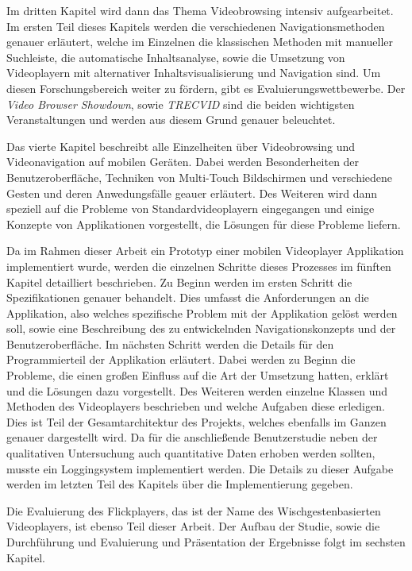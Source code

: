 \documentclass[11pt,a4paper]{report}
\begin{document}
Im dritten Kapitel wird dann das Thema Videobrowsing intensiv aufgearbeitet. Im ersten Teil dieses Kapitels werden die verschiedenen Navigationsmethoden genauer erläutert, welche im Einzelnen die klassischen Methoden mit manueller Suchleiste, die automatische Inhaltsanalyse, sowie die Umsetzung von Videoplayern mit alternativer Inhaltsvisualisierung und Navigation sind. Um diesen Forschungsbereich weiter zu fördern, gibt es Evaluierungswettbewerbe. Der \emph{Video Browser Showdown}, sowie \emph{TRECVID} sind die beiden wichtigsten Veranstaltungen und werden aus diesem Grund genauer beleuchtet. 

Das vierte Kapitel beschreibt alle Einzelheiten über Videobrowsing und Videonavigation auf mobilen Geräten. Dabei werden Besonderheiten der Benutzeroberfläche, Techniken von Multi-Touch Bildschirmen und verschiedene Gesten und deren Anwedungsfälle geauer erläutert. Des Weiteren wird dann speziell auf die Probleme von Standardvideoplayern eingegangen und einige Konzepte von Applikationen vorgestellt, die Lösungen für diese Probleme liefern.

Da im Rahmen dieser Arbeit ein Prototyp einer mobilen Videoplayer Applikation implementiert wurde, werden die einzelnen Schritte dieses Prozesses im fünften Kapitel detailliert beschrieben. Zu Beginn werden im ersten Schritt die Spezifikationen genauer behandelt. Dies umfasst die Anforderungen an die Applikation, also welches spezifische Problem mit der Applikation gelöst werden soll, sowie eine Beschreibung des zu entwickelnden Navigationskonzepts und der Benutzeroberfläche. Im nächsten Schritt werden die Details für den Programmierteil der Applikation erläutert. Dabei werden zu Beginn die Probleme, die einen großen Einfluss auf die Art der Umsetzung hatten, erklärt und die Lösungen dazu vorgestellt. Des Weiteren werden einzelne Klassen und Methoden des Videoplayers beschrieben und welche Aufgaben diese erledigen. Dies ist Teil der Gesamtarchitektur des Projekts, welches ebenfalls im Ganzen genauer dargestellt wird. Da für die anschließende Benutzerstudie neben der qualitativen Untersuchung auch quantitative Daten erhoben werden sollten, musste ein Loggingsystem implementiert werden. Die Details zu dieser Aufgabe werden im letzten Teil des Kapitels über die Implementierung gegeben.

Die Evaluierung des Flickplayers, das ist der Name des Wischgestenbasierten Videoplayers, ist ebenso Teil dieser Arbeit. Der Aufbau der Studie, sowie die Durchführung und Evaluierung und Präsentation der Ergebnisse folgt im sechsten Kapitel.
\end{document}
